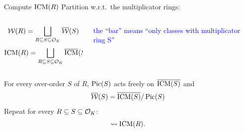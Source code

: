 \documentclass{beamer}
\begin{document}
\begin{frame}{Compute $\operatorname{ICM}(R)$ }
\pause Partition w.r.t.~the multiplicator rings:
    \begin{columns}
    \begin{column}{0.5\textwidth}
      \[ {\mathcal W}(R) = \bigsqcup_{R\subseteq S \subseteq {\mathcal O}_K} \overline {{\mathcal W}}(S)\]
      \[\operatorname{ICM}(R) = \bigsqcup_{R\subseteq S \subseteq {\mathcal O}_K} \overline {\operatorname{ICM}}(S)\]
    \end{column}
\pause
    \begin{column}{0.5\textwidth}  %
	\begin{center}
	\textcolor{blue}{\parbox{10em}{the ``bar'' means ``only classes with multiplicator ring S''}} 
	\end{center}
    \end{column}
    \end{columns}
\pause
   \begin{theorem}[M.]
    For every over-order $S$ of $R$, $\operatorname{Pic}(S)$ acts freely on $\overline{\operatorname{ICM}(S)}$ and
    \[ \overline{{\mathcal W}}(S) = \overline{\operatorname{ICM}(S)}/\operatorname{Pic}(S) \]
\pause Repeat for every $R\subseteq S \subseteq {\mathcal O}_K$:
    \[ \rightsquigarrow \operatorname{ICM}(R).\]
   \end{theorem}
\end{frame}
\end{document}
